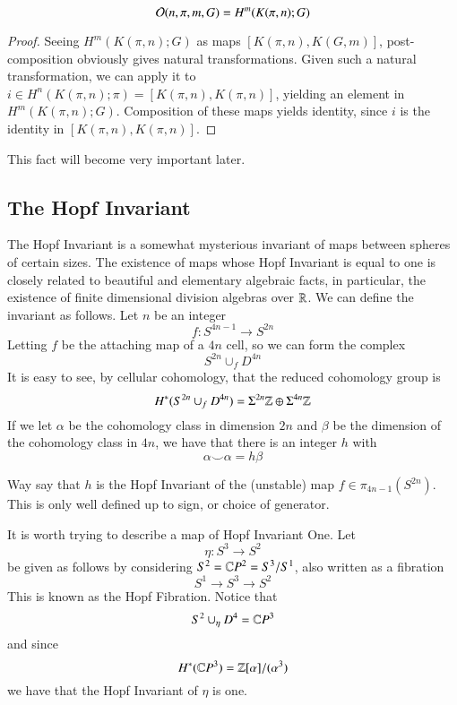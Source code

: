 \begin{Cor}
  \label{sec:SteenrodAreCohom}
  \[\mathcal{O}(n,\pi,m,G)=H^m(K(\pi,n);G)\]
\end{Cor}

\begin{proof}
  Seeing $H^m(K(\pi,n);G)$ as maps $[K(\pi,n),K(G,m)]$, post-composition obviously gives natural transformations.  Given such a natural transformation, we can apply it to $i\in H^n(K(\pi,n);\pi)=[K(\pi,n),K(\pi,n)]$, yielding an element in $H^m(K(\pi,n);G)$.  Composition of these maps yields identity, since $i$ is the identity in $[K(\pi,n),K(\pi,n)]$.  
\end{proof}

This fact will become very important later.  

\subsection{The Hopf Invariant}

\label{sec:HopfInvariant}

The Hopf Invariant is a somewhat mysterious invariant of maps between spheres of certain sizes. The existence of maps whose Hopf Invariant is equal to one is closely related to beautiful and elementary algebraic facts, in particular, the existence of finite dimensional division algebras over $\mathbb{R}$.  
We can define the invariant as follows.  
Let $n$ be an integer
\[f:S^{4n-1}\to S^{2n}\]
Letting $f$ be the attaching map of a $4n$ cell, so we can form the complex
\[S^{2n}\cup_f D^{4n}\]
It is easy to see, by cellular cohomology, that the reduced cohomology group is
\[H^*(S^{2n}\cup_f D^{4n})=\Sigma^{2n}\mathbb{Z}\oplus \Sigma^{4n}\mathbb{Z}\]
If we let $\alpha$ be the cohomology class in dimension $2n$ and $\beta$ be the dimension of the cohomology class in $4n$, we have that there is an integer $h$ with
\[\alpha\smile\alpha=h\beta\]
\begin{Def}
  Way say that $h$ is the Hopf Invariant of the (unstable) map $f\in \pi_{4n-1}(S^{2n})$.  This is only well defined up to sign, or choice of generator.  
\end{Def}

It is worth trying to describe a map of Hopf Invariant One.
Let
\[\eta : S^3\to S^2\]
be given as follows by considering $S^2=\mathbb{C} P^2=S^3/S^1$, also written as a fibration
\[S^1\to S^3\to S^2\]
This is known as the Hopf Fibration.  
Notice that 
\[S^2\cup_\eta D^4=\mathbb{C} P^3\]
 and since 
\[H^*(\mathbb{C} P^3) = \mathbb{Z}[\alpha]/(\alpha^3)\]
we have that the Hopf Invariant of $\eta$ is one.  

